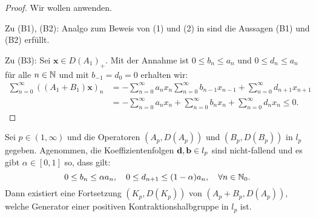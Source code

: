 \begin{proof}
\par
Wir wollen  anwenden.

\par
Zu (B1), (B2): Analgo zum Beweis von (1) und (2) in  sind die Aussagen (B1) und (B2)  erfüllt.

\par
Zu (B3): Sei $\textbf{x}\in D(A_1)_+$. Mit der Annahme ist $0\leq b_n\leq a_n$ und $0\leq d_n\leq a_n$ für alle $n\in\mathbb{N}$ und mit $b_{-1}=d_0=0$ erhalten wir:
\begin{align*}
\sum_{n=0}^\infty ((A_1+B_1)\textbf{x})_n
&= -\sum_{n=0}^\infty a_n x_n \sum_{n=0}^\infty b_{n-1}x_{n-1}+\sum_{n=0}^\infty d_{n+1}x_{n+1}\\
&=-\sum_{n=0}^\infty a_n x_n + \sum_{n=0}^\infty b_n x_n+\sum_{n=0}^\infty d_n x_n\leq 0.
\end{align*}
\end{proof}








\begin{fsatz}\cite{banasiak_lachowicz_2007}\label{Fortsetzung von K_p}
Sei $p\in(1,\infty)$ und die  Operatoren $(A_p, D(A_p))$ und  $(B_p, D(B_p))$ in $l_p$ gegeben. Agenommen, die Koeffizientenfolgen $\textnormal{\textbf{d}}, \textnormal{\textbf{b}}\in l_p$ sind nicht-fallend und es gibt $\alpha\in[0,1]$ so, dass gilt:
\begin{equation*}\label{Annahme für Abschätzung}
0\leq b_n\leq \alpha a_n,\quad 0\leq d_{n+1}\leq (1-\alpha)a_n, \quad \forall n\in \mathbb{N}_0.
\end{equation*}
Dann existiert eine Fortsetzung $(K_p, D(K_p))$ von  $(A_p + B_p, D(A_p))$, welche Generator einer positiven Kontraktionshalbgruppe in $l_p$ ist.
\end{fsatz}

